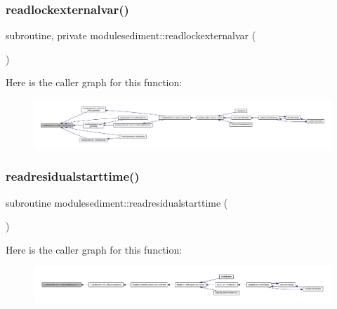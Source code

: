 \mbox{\label{namespacemodulesediment_a94b876e44c6f435015c969c6a2f32978}} 
\subsubsection{\texorpdfstring{readlockexternalvar()}{readlockexternalvar()}}
{\footnotesize\ttfamily subroutine, private modulesediment\+::readlockexternalvar (\begin{DoxyParamCaption}{ }\end{DoxyParamCaption})\hspace{0.3cm}{\ttfamily [private]}}

Here is the caller graph for this function\+:\nopagebreak
\begin{figure}[H]
\begin{center}
\leavevmode
\includegraphics[width=350pt]{namespacemodulesediment_a94b876e44c6f435015c969c6a2f32978_icgraph}
\end{center}
\end{figure}
\mbox{\label{namespacemodulesediment_a6afc209e64c494c64bdded6011c28e6e}} 
\subsubsection{\texorpdfstring{readresidualstarttime()}{readresidualstarttime()}}
{\footnotesize\ttfamily subroutine modulesediment\+::readresidualstarttime (\begin{DoxyParamCaption}{ }\end{DoxyParamCaption})\hspace{0.3cm}{\ttfamily [private]}}

Here is the caller graph for this function\+:\nopagebreak
\begin{figure}[H]
\begin{center}
\leavevmode
\includegraphics[width=350pt]{namespacemodulesediment_a6afc209e64c494c64bdded6011c28e6e_icgraph}
\end{center}
\end{figure}
\mbox{\label{namespacemodulesediment_a8c3164236748ba94c8bef14c5dd430b9}} 
